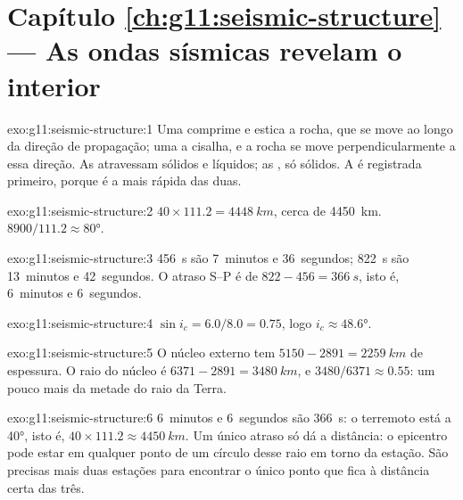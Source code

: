\section*{Capítulo \ref{ch:g11:seismic-structure} --- As ondas sísmicas revelam o interior}

\begin{solution}{exo:g11:seismic-structure:1}
Uma  comprime e estica a rocha, que se move ao longo da direção de
propagação; uma  a cisalha, e a rocha se move perpendicularmente a essa
direção. As  atravessam sólidos e líquidos; as , só sólidos. A
 é registrada primeiro, porque é a mais rápida das duas.
\end{solution}

\begin{solution}{exo:g11:seismic-structure:2}
$40 \times 111.2 = \qty{4448}{km}$, cerca de \qty{4450}{km}. $8900/111.2
\approx \ang{80}$.
\end{solution}

\begin{solution}{exo:g11:seismic-structure:3}
\qty{456}{s} são 7~minutos e 36~segundos; \qty{822}{s} são 13~minutos e
42~segundos. O atraso S--P é de $822 - 456 = \qty{366}{s}$, isto é,
6~minutos e 6~segundos.
\end{solution}

\begin{solution}{exo:g11:seismic-structure:4}
$\sin i_c = 6.0/8.0 = 0.75$, logo $i_c \approx \ang{48.6}$.
\end{solution}

\begin{solution}{exo:g11:seismic-structure:5}
O núcleo externo tem $5150 - 2891 = \qty{2259}{km}$ de espessura. O raio do
núcleo é $6371 - 2891 = \qty{3480}{km}$, e $3480/6371 \approx 0.55$: um pouco
mais da metade do raio da Terra.
\end{solution}

\begin{solution}{exo:g11:seismic-structure:6}
6~minutos e 6~segundos são \qty{366}{s}: o terremoto está a \ang{40}, isto
é, $40 \times 111.2 \approx \qty{4450}{km}$. Um único atraso só dá a
distância: o epicentro pode estar em qualquer ponto de um círculo desse raio
em torno da estação. São precisas mais duas estações para encontrar o único
ponto que fica à distância certa das três.
\end{solution}

